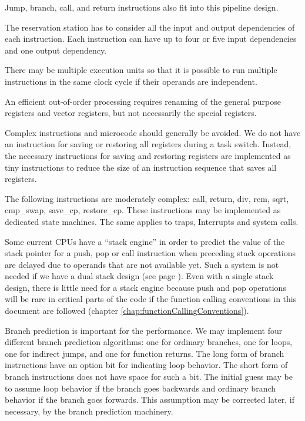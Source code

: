 \documentclass[forwardcom.tex]{subfiles}
\begin{document}
Jump, branch, call, and return instructions also fit into this pipeline design. 
\vspace{2mm}

The reservation station has to consider all the input and output dependencies of each instruction. Each instruction can have up to four or five input dependencies and one output dependency. 
\vspace{2mm}

There may be multiple execution units so that it is possible to run multiple instructions in the same clock cycle if their operands are independent. 
\vspace{2mm}

An efficient out-of-order processing requires renaming of the general purpose registers and vector registers, but not necessarily the special registers. 
\vspace{2mm}

Complex instructions and microcode should generally be avoided. We do not have an instruction for saving or restoring all registers during a task switch. Instead, the necessary instructions for saving and restoring registers are implemented as tiny instructions to reduce the size of an instruction sequence that saves all registers. 
\vspace{2mm}

The following instructions are moderately complex: call, return, div, rem, sqrt, cmp\_swap, save\_cp, restore\_cp. These instructions may be implemented as dedicated state machines. The same applies to traps, Interrupts and system calls. 
\vspace{2mm}

Some current CPUs have a ``stack engine'' in order to predict the value of the stack pointer for a push, pop or call instruction when preceding stack operations are delayed due to operands that are not available yet. Such a system is not needed if we have a dual stack design (see page \pageref{dualStack}). Even with a single stack design, there is little need for a stack engine because push and pop operations will be rare in critical parts of the code if the function calling conventions in this document are followed (chapter \ref{chap:functionCallingConventions}). 
\vspace{2mm}

Branch prediction is important for the performance. We may implement four different branch prediction algorithms: one for ordinary branches, one for loops, one for indirect jumps, and one for function returns. The long form of branch instructions have an option bit for indicating loop behavior. The short form of branch instructions does not have space for such a bit. The initial guess may be to assume loop behavior if the branch goes backwards and ordinary branch behavior if the branch goes forwards. This assumption may be corrected later, if necessary, by the branch prediction machinery. 
\vspace{2mm}
\end{document}

